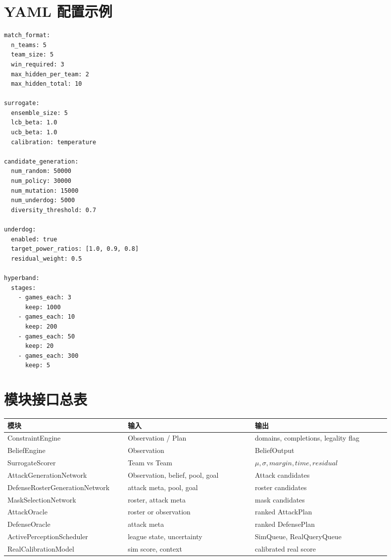 \documentclass[UTF8,12pt,openany]{ctexbook}
\begin{document}
\section{YAML 配置示例}
\begin{lstlisting}[caption={系统配置示例}]
match_format:
  n_teams: 5
  team_size: 5
  win_required: 3
  max_hidden_per_team: 2
  max_hidden_total: 10

surrogate:
  ensemble_size: 5
  lcb_beta: 1.0
  ucb_beta: 1.0
  calibration: temperature

candidate_generation:
  num_random: 50000
  num_policy: 30000
  num_mutation: 15000
  num_underdog: 5000
  diversity_threshold: 0.7

underdog:
  enabled: true
  target_power_ratios: [1.0, 0.9, 0.8]
  residual_weight: 0.5

hyperband:
  stages:
    - games_each: 3
      keep: 1000
    - games_each: 10
      keep: 200
    - games_each: 50
      keep: 20
    - games_each: 300
      keep: 5
\end{lstlisting}

\section{模块接口总表}
\begin{longtable}{p{0.28\linewidth}p{0.30\linewidth}p{0.32\linewidth}}
\toprule
模块 & 输入 & 输出 \\
\midrule
ConstraintEngine & Observation / Plan & domains, completions, legality flag \\
BeliefEngine & Observation & BeliefOutput \\
SurrogateScorer & Team vs Team & $\mu,\sigma,margin,time,residual$ \\
AttackGenerationNetwork & Observation, belief, pool, goal & Attack candidates \\
DefenseRosterGenerationNetwork & attack meta, pool, goal & roster candidates \\
MaskSelectionNetwork & roster, attack meta & mask candidates \\
AttackOracle & roster or observation & ranked AttackPlan \\
DefenseOracle & attack meta & ranked DefensePlan \\
ActivePerceptionScheduler & league state, uncertainty & SimQueue, RealQueryQueue \\
RealCalibrationModel & sim score, context & calibrated real score \\
\bottomrule
\end{longtable}
\end{document}
